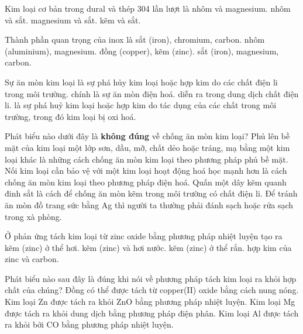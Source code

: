 \documentclass[11pt,a4paper]{article}
\def\loigiai#1{}
\begin{document}
\newpage

\begin{ex}
Kim loại cơ bản trong dural và thép 304 lần lượt là
\choice
{nhôm và magnesium.}
{nhôm và sắt.}
{magnesium và sắt.}
{kẽm và sắt.}
\loigiai{}
\end{ex}

\begin{ex}
Thành phần quan trọng của inox là
\choice
{sắt (iron), chromium, carbon.}
{nhôm (aluminium), magnesium.}
{đồng (copper), kẽm (zinc).}
{sắt (iron), magnesium, carbon.}
\loigiai{}
\end{ex}

\begin{ex}
Sự ăn mòn kim loại
\choice
{là sự phá hủy kim loại hoặc hợp kim do các chất điện li trong môi trường.}
{chính là sự ăn mòn điện hoá.}
{diễn ra trong dung dịch chất điện li.}
{là sự phá huỷ kim loại hoặc hợp kim do tác dụng của các chất trong môi trường, trong đó kim loại bị oxi hoá.}
\loigiai{}
\end{ex}

\begin{ex}
Phát biểu nào dưới đây là \textbf{không đúng} về chống ăn mòn kim loại?
\choice
{Phủ lên bề mặt của kim loại một lớp sơn, dầu, mỡ, chất dẻo hoặc tráng, mạ bằng một kim loại khác là những cách chống ăn mòn kim loại theo phương pháp phủ bề mặt.}
{Nối kim loại cần bảo vệ với một kim loại hoạt động hoá học mạnh hơn là cách chống ăn mòn kim loại theo phương pháp điện hoá.}
{Quấn một dây kẽm quanh đinh sắt là cách để chống ăn mòn kẽm trong môi trường có chất điện li.}
{Để tránh ăn mòn đồ trang sức bằng Ag thì người ta thường phải đánh sạch hoặc rửa sạch trong xà phòng.}
\loigiai{}
\end{ex}

\begin{ex}
Ở phản ứng tách kim loại từ zinc oxide bằng phương pháp nhiệt luyện tạo ra
\choice
{kẽm (zinc) ở thể hơi.}
{kẽm (zinc) và hơi nước.}
{kẽm (zinc) ở thể rắn.}
{hợp kim của zinc và carbon.}
\loigiai{}
\end{ex}

\begin{ex}
Phát biểu nào sau đây là đúng khi nói về phương pháp tách kim loại ra khỏi hợp chất của chúng?
\choice
{Đồng có thể được tách từ copper(II) oxide bằng cách nung nóng.}
{Kim loại Zn được tách ra khỏi ZnO bằng phương pháp nhiệt luyện.}
{Kim loại Mg được tách ra khỏi dung dịch  bằng phương pháp điện phân.}
{Kim loại Al được tách ra khỏi  bởi CO bằng phương pháp nhiệt luyện.}
\loigiai{}
\end{ex}
\end{document}
